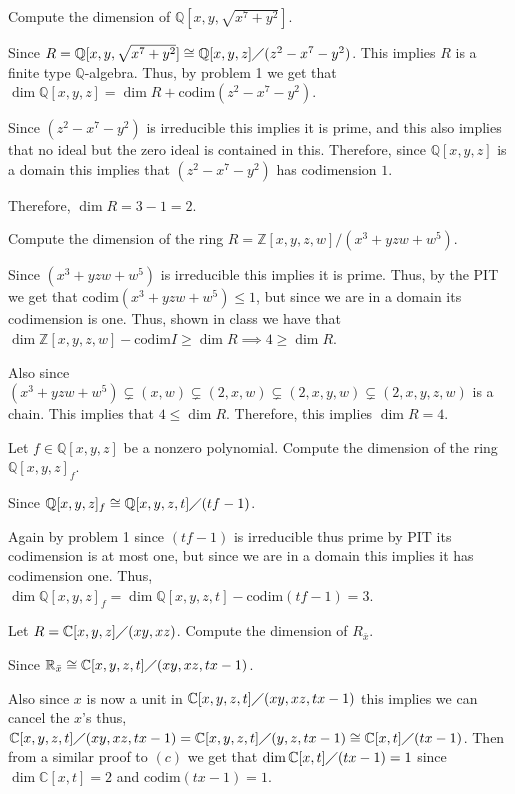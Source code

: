 \documentclass[12pt, letterpaper]{article}
\newcommand{\C}{\mathbb{C}}
\newcommand{\R}{\mathbb{R}}
\newcommand{\Q}{\mathbb{Q}}
\newcommand{\Z}{\mathbb{Z}}
\newcommand{\codim}{\mathrm{codim}}
\begin{document}
\qh
\begin{subproblem}{}
    Compute the dimension of $\Q[x,y,\sqrt{x^7 + y^2}]$.
\end{subproblem}
\begin{problemproof}
    Since $R=\Q[x,y,\sqrt{x^7+y^2}] \cong \Q[x,y,z] \diagup (z^2-x^7-y^2)$. This implies 
    $R$ is a finite type $\Q$-algebra. Thus, by problem 1 we get that $\dim \Q[x,y,z] = \dim R + \codim (z^2-x^7-y^2)$.

    Since $(z^2-x^7-y^2)$ is irreducible this implies it is prime, and this also implies that no ideal but the zero ideal is contained in this. Therefore, since $\Q[x,y,z]$
    is a domain this implies that $(z^2-x^7-y^2)$ has codimension $1$.

    Therefore, $\dim R = 3-1=2$.
\end{problemproof}

\begin{subproblem}{}
    Compute the dimension of the ring $R=\Z[x, y, z, w]/(x^3 + yzw + w^5)$.
\end{subproblem}
\begin{problemproof}
    Since $(x^3+yzw + w^5)$ is irreducible this implies it is prime. Thus, by the PIT we get that $\codim (x^3+yzw+w^5) \leq 1$, but since we are in a domain its codimension is one. Thus, shown in class we have that $\dim \Z[x,y,z,w] - \codim I \geq \dim R \implies 4 \geq \dim R$.

    Also since $(x^3+yzw+w^5) \subsetneq (x,w) \subsetneq (2,x,w) \subsetneq (2,x,y,w) \subsetneq (2,x,y,z,w)$ is a chain. This implies that $4 \leq \dim R$. Therefore, this implies $\dim R = 4$.
\end{problemproof}

\begin{subproblem}{}
    Let $f \in \Q[x,y,z]$ be a nonzero polynomial. Compute the dimension of the ring $\Q[x,y,z]_f$.
\end{subproblem}
\begin{problemproof}
    Since $\Q[x,y,z]_f \cong \Q[x,y,z,t] \diagup (tf-1)$.

    Again by problem 1 since $(tf-1)$ is irreducible thus prime by PIT its codimension is at most one, but since we are in a domain this implies it has codimension one. Thus, $\dim \Q[x,y,z]_f = \dim \Q[x,y,z,t] - \codim (tf-1) = 3$.
\end{problemproof}

\begin{subproblem}{}
    Let $R = \C[x,y,z] \diagup (xy,xz)$. Compute the dimension of $R_{\bar{x}}$.
\end{subproblem}
\begin{problemproof}
    Since $\R_{\bar{x}} \cong \C[x,y,z,t] \diagup (xy,xz,tx-1)$. 
    
    Also since $x$ is now a unit in $\C[x,y,z,t] \diagup (xy,xz,tx-1)$ this implies we can cancel the $x$'s thus, $\C[x,y,z,t] \diagup (xy,xz,tx-1) = \C[x,y,z,t] \diagup (y,z,tx-1) \cong \C[x,t] \diagup (tx-1)$. Then from a similar proof to $(c)$ we get that $\dim \C[x,t] \diagup (tx-1) = 1$ since $\dim \C[x,t]=2$ and $\codim (tx-1)=1$.
\end{problemproof}
\end{document}
